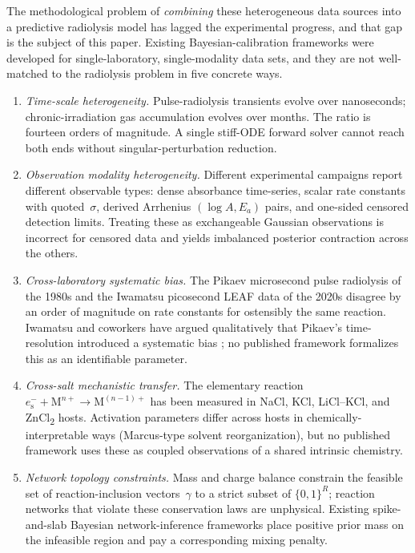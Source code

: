 \documentclass[12pt]{article}
\theoremstyle{plain}
\theoremstyle{definition}
\theoremstyle{remark}
\newcommand{\eS}{\ensuremath{e_{\mathrm{s}}^{-}}\xspace}
\newcommand{\Ea}{E_a}
\begin{document}
The methodological problem of \emph{combining} these heterogeneous data sources
into a predictive radiolysis model has lagged the experimental progress, and
that gap is the subject of this paper.  Existing Bayesian-calibration frameworks
were developed for single-laboratory, single-modality data sets, and they are
not well-matched to the radiolysis problem in five concrete ways.

\begin{enumerate}
\item \emph{Time-scale heterogeneity.}  Pulse-radiolysis transients evolve over
nanoseconds; chronic-irradiation gas accumulation evolves over months.  The
ratio is fourteen orders of magnitude.  A single stiff-ODE forward solver
cannot reach both ends without singular-perturbation reduction.
\item \emph{Observation modality heterogeneity.}  Different experimental
campaigns report different observable types: dense absorbance time-series,
scalar rate constants with quoted~$\sigma$, derived Arrhenius
$(\log A, \Ea)$ pairs, and one-sided censored detection limits.  Treating
these as exchangeable Gaussian observations is incorrect for censored data
and yields imbalanced posterior contraction across the others.
\item \emph{Cross-laboratory systematic bias.}  The Pikaev microsecond pulse
radiolysis of the 1980s and the Iwamatsu picosecond LEAF data of the 2020s
disagree by an order of magnitude on rate constants for ostensibly the same
reaction.  Iwamatsu and coworkers have argued qualitatively that Pikaev's
time-resolution introduced a systematic bias \citep{Iwamatsu2022}; no
published framework formalizes this as an identifiable parameter.
\item \emph{Cross-salt mechanistic transfer.}  The elementary reaction
$\eS+\mathrm{M}^{n+}\to\mathrm{M}^{(n-1)+}$ has been measured in NaCl, KCl,
LiCl--KCl, and ZnCl\textsubscript{2} hosts.  Activation parameters differ
across hosts in chemically-interpretable ways (Marcus-type solvent
reorganization), but no published framework uses these as coupled
observations of a shared intrinsic chemistry.
\item \emph{Network topology constraints.}  Mass and charge balance constrain
the feasible set of reaction-inclusion vectors~$\gamma$ to a strict subset of
$\{0,1\}^R$; reaction networks that violate these conservation laws are
unphysical.  Existing spike-and-slab Bayesian network-inference frameworks
\citep{GalagaliMarzouk2015,GalagaliMarzouk2019} place positive prior mass on
the infeasible region and pay a corresponding mixing penalty.
\end{enumerate}
\end{document}
